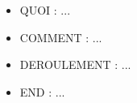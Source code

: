 

\begin{itemize} \itemsep 4mm
	\item QUOI : ...
	\item COMMENT : ...
	\item DEROULEMENT : ...
	\item END : ...
\end{itemize}
